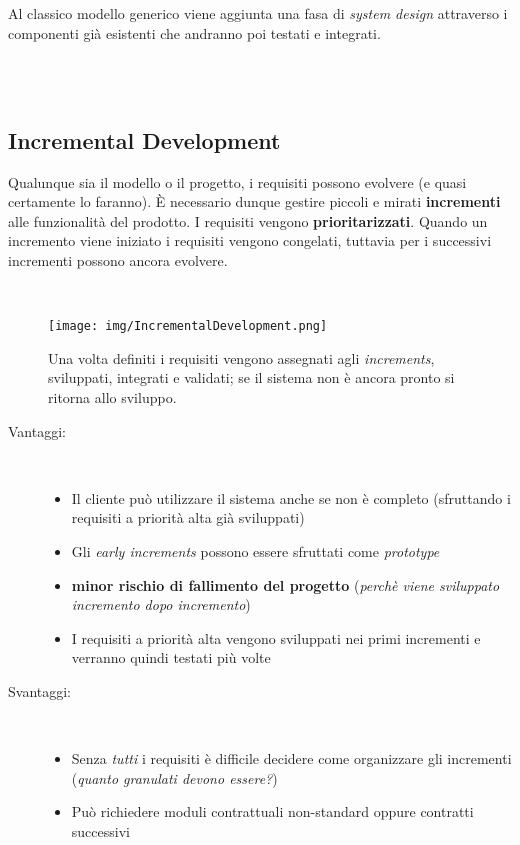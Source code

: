 Al classico modello generico viene aggiunta una fasa di \textit {
system design} attraverso i componenti gi\`a esistenti che andranno
poi testati e integrati.

\ \\~\\
\subsection{Incremental Development}
Qualunque sia il modello o il progetto, i requisiti possono evolvere
(e quasi certamente lo faranno). \`E necessario dunque gestire
piccoli e mirati \textbf{incrementi} alle funzionalit\`a del prodotto.
I requisiti vengono \textbf{prioritarizzati}. Quando un incremento
viene iniziato i requisiti vengono congelati, tuttavia per i successivi
incrementi possono ancora evolvere.

\ \\
\begin{figure}[H]
    \centering
    \texttt{[image: img/IncrementalDevelopment.png]}
    \caption*{Una volta definiti i requisiti vengono assegnati
        agli \textit{increments}, sviluppati, integrati e validati;
        se il sistema non \`e ancora pronto si ritorna allo sviluppo.}
\end{figure}

\newpage
\begin{description}
    \item[Vantaggi:]\ 
    \begin{itemize}
        \item Il cliente pu\`o utilizzare il sistema anche se non
                \`e completo (sfruttando i requisiti a priorit\`a
                alta gi\`a sviluppati)
        \item Gli \textit{early increments} possono essere sfruttati
                come \textit{prototype}
        \item \textbf{minor rischio di fallimento del progetto}
                (\textit{perch\`e viene sviluppato incremento dopo
                    incremento})
        \item I requisiti a priorit\`a alta vengono sviluppati nei
                primi incrementi e verranno quindi testati pi\`u volte 
    \end{itemize} 
    \item[Svantaggi:]\ 
    \begin{itemize}
        \item Senza \textit{tutti} i requisiti \`e difficile decidere
                come organizzare gli incrementi (\textit{quanto
                granulati devono essere?})
        \item Pu\`o richiedere moduli contrattuali non-standard oppure
                contratti successivi
    \end{itemize} 
\end{description}

